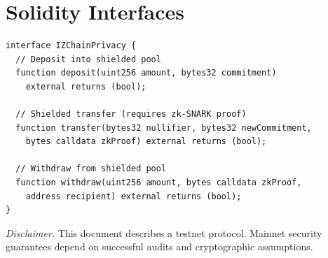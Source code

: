 \section{Solidity Interfaces}


\begin{verbatim}
interface IZChainPrivacy {
  // Deposit into shielded pool
  function deposit(uint256 amount, bytes32 commitment)
    external returns (bool);

  // Shielded transfer (requires zk-SNARK proof)
  function transfer(bytes32 nullifier, bytes32 newCommitment,
    bytes calldata zkProof) external returns (bool);

  // Withdraw from shielded pool
  function withdraw(uint256 amount, bytes calldata zkProof,
    address recipient) external returns (bool);
}
\end{verbatim}

\vspace{1em}
\noindent\textit{Disclaimer.} This document describes a testnet protocol. Mainnet security guarantees depend on successful audits and cryptographic assumptions.

